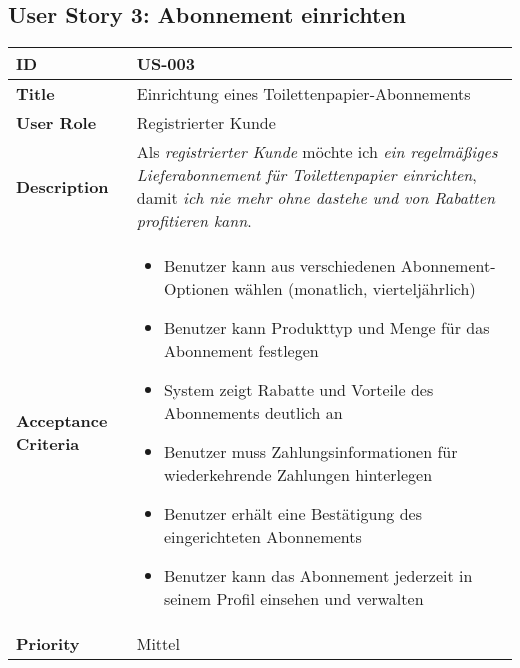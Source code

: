 \documentclass[a4paper,11pt]{article}
\begin{document}
\subsection{User Story 3: Abonnement einrichten}
\begin{tabularx}{\textwidth}{|l|X|}
    \hline
    \textbf{ID} & US-003 \\
    \hline
    \textbf{Title} & Einrichtung eines Toilettenpapier-Abonnements \\
    \hline
    \textbf{User Role} & Registrierter Kunde \\
    \hline
    \textbf{Description} & Als \textit{registrierter Kunde} möchte ich \textit{ein regelmäßiges Lieferabonnement für Toilettenpapier einrichten}, damit \textit{ich nie mehr ohne dastehe und von Rabatten profitieren kann}. \\
    \hline
    \textbf{Acceptance Criteria} & 
    \begin{itemize}
        \item Benutzer kann aus verschiedenen Abonnement-Optionen wählen (monatlich, vierteljährlich)
        \item Benutzer kann Produkttyp und Menge für das Abonnement festlegen
        \item System zeigt Rabatte und Vorteile des Abonnements deutlich an
        \item Benutzer muss Zahlungsinformationen für wiederkehrende Zahlungen hinterlegen
        \item Benutzer erhält eine Bestätigung des eingerichteten Abonnements
        \item Benutzer kann das Abonnement jederzeit in seinem Profil einsehen und verwalten
    \end{itemize} \\
    \hline
    \textbf{Priority} & Mittel \\
    \hline
\end{tabularx}
\end{document}
